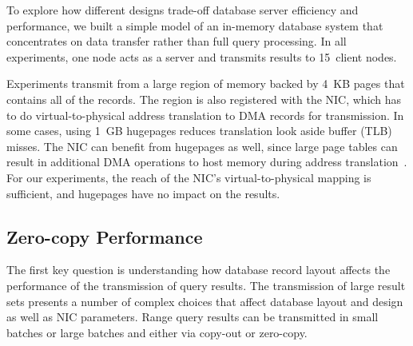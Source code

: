 To explore how different designs trade-off database server efficiency and
performance, we built a simple model of an in-memory database system that
concentrates on data transfer rather than full query processing.  In all experiments, one node acts
as a server and transmits results to 15~client nodes.

Experiments transmit from a large region of memory backed by 4~KB pages that contains all of
the records.  The region is also
registered with the NIC, which has to do virtual-to-physical address
translation to DMA records for transmission.
In some cases, using 1~GB hugepages reduces translation look aside buffer
(TLB) misses.  The NIC can benefit from
hugepages as well, since large page tables can result in additional
DMA operations to host memory during address translation~\cite{farm,rdma}.  For
our experiments, the reach of the NIC's virtual-to-physical mapping is
sufficient, and hugepages have no impact on the results.

\subsection{Zero-copy Performance}
\label{sec:zero-copy-tput}

%

The first key question is understanding how database record layout affects the
performance of the transmission of query results.  The transmission of large
result sets presents a number of complex choices that affect
database layout and design as well as NIC parameters.  Range query
results can be transmitted in small batches or large batches and either via
copy-out or zero-copy.

